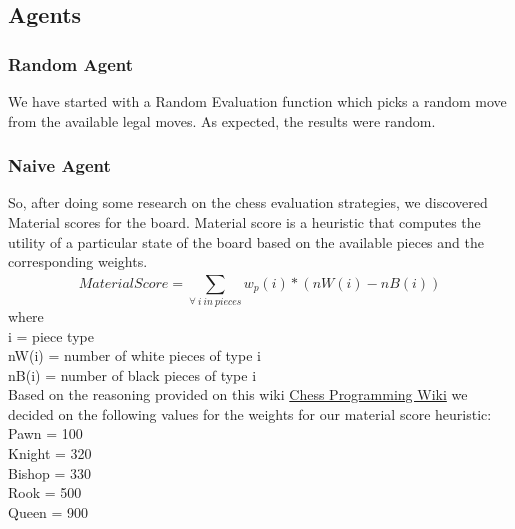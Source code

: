 \documentclass[12pt]{article}
\begin{document}
\subsection{Agents}
\subsubsection{Random Agent}
We have started with a Random Evaluation function which picks a random move from the available legal moves. As expected, the results were random. 
\subsubsection{Naive Agent}
So, after doing some research on the chess evaluation strategies, we discovered Material scores for the board. Material score is a heuristic that computes the utility of a particular state of the board based on the available pieces and the corresponding weights.
 $$
Material Score =\sum_{\forall \: i \: in \: pieces}^{} w_p(i)*(nW(i)-nB(i))$$
where \\
 i = piece type \\
nW(i) = number of white pieces of type i \\
nB(i) = number of black pieces of type i\\

\noindent Based on the reasoning provided on this wiki  \href{https://www.chessprogramming.org/Simplified_Evaluation_Function}{Chess Programming Wiki}
we decided on the following values for the weights for our material score heuristic: \\
Pawn = 100 \\
Knight = 320 \\
Bishop = 330 \\
Rook = 500 \\
Queen = 900 \\
\end{document}
